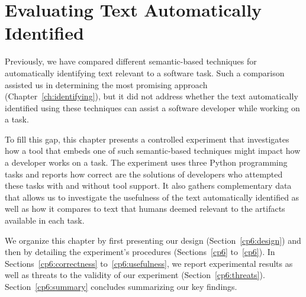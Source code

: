 \setcounter{chapter}{5}
\setcounter{rq}{1}


\chapter{Evaluating Text Automatically Identified}
\label{ch:assisting}




Previously, we have compared different semantic-based techniques for automatically identifying text relevant to a software task.
Such a comparison assisted us in determining the most promising approach (Chapter~\ref{ch:identifying}), but it did not address whether 
the text automatically identified  
using these techniques can assist a software developer while working on a task.



To fill this gap, this chapter presents a controlled experiment that 
investigates how a tool that embeds one of such semantic-based techniques 
might impact how a developer works on a task. 
The experiment 
uses  three Python programming tasks and reports
how correct are the solutions of developers who attempted these tasks with and without tool support.
It also gathers complementary data that allows us to investigate the usefulness of the text automatically identified
as well as how it compares to text that humans deemed relevant to the artifacts available in each task.



We organize this chapter by first presenting our design (Section~\ref{cp6:design}) and then 
by detailing the experiment's procedures (Sections~\ref{cp6} to~\ref{cp6}).
In Sections~\ref{cp6:correctness} to~\ref{cp6:usefulness}, we report experimental results 
as well as threats to the validity of our experiment (Section~\ref{cp6:threats}).
 Section~\ref{cp6:summary}
 concludes summarizing our key findings.


\clearpage














% 




